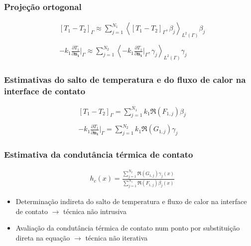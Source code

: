 \documentclass{beamer}
\begin{document}
\begin{frame}
	\frametitle{Projeção ortogonal}
	\begin{alertblock}{}
		\begin{align*}
		& [T_1 - T_2]_\Gamma \approx \sum_{j=1}^{N_1} \left\langle  \left[T_1 - T_2\right]_\Gamma, \beta_j \right\rangle_{L^2(\Gamma)} \beta_j \\ \\
		& - k_1 \frac{\partial T_1}{\partial\mathbf{n_1}}\bigg|_\Gamma \approx \sum_{j=1}^{N_2} \left\langle  -k_1 \frac{\partial T_1}{\partial\mathbf{n_1}}\bigg|_\Gamma, \gamma_j \right\rangle_{L^2(\Gamma)} \gamma_j
		\end{align*}
	\end{alertblock}
\end{frame}

\begin{frame}
	\frametitle{Estimativas do salto de temperatura e do fluxo de calor na interface de contato}
	\begin{alertblock}{}
		\begin{align*}
		& [T_1 - T_2]_\Gamma = \sum_{j=1}^{N_1} k_1 \Re(F_{1,j}) \beta_j \\ \\
		& - k_1 \frac{\partial T_1}{\partial\mathbf{n_1}}\bigg|_\Gamma = \sum_{j=1}^{N_2} k_1 \Re(G_{1,j}) \gamma_j
		\end{align*}
	\end{alertblock}
\end{frame}

\begin{frame}
	\frametitle{Estimativa da condutância térmica de contato}
	\begin{alertblock}{}
		\begin{align*}
		& h_c(x) %
		= \frac{\displaystyle\sum_{j=1}^{N_2} \Re(G_{1,j}) \gamma_j(x)}{\displaystyle\sum_{j=1}^{N_1} \Re(F_{1,j}) \beta_j(x)}
		\end{align*}
	\end{alertblock}

	\pause
	\begin{itemize}
		\item Determinação indireta do salto de temperatura e fluxo de calor na interface de contato $\rightarrow$ técnica não intrusiva
		\pause
	\item Avaliação da condutância térmica de contato num ponto por substituição direta na equação $\rightarrow$ técnica não iterativa
	\end{itemize}
\end{frame}
\end{document}
